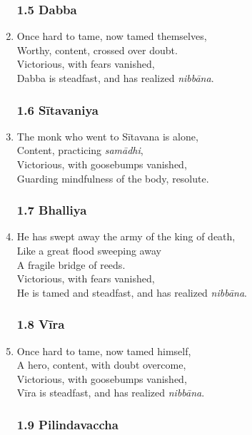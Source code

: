 \documentclass[10pt, openany]{book}
\begin{document}
\begin{enumerate}
\subsubsection*{1.5 Dabba}

\item Once hard to tame, now tamed themselves,\\
Worthy, content, crossed over doubt.\\
Victorious, with fears vanished,\\
Dabba is steadfast, and has realized \emph{nibbāna}.

\subsubsection*{1.6 Sītavaniya}

\item The monk who went to Sītavana is alone,\\
Content, practicing \emph{samādhi},\\
Victorious, with goosebumps vanished,\\
Guarding mindfulness of the body, resolute.

\subsubsection*{1.7 Bhalliya}

\item He has swept away the army of the king of death,\\
Like a great flood sweeping away\\
A fragile bridge of reeds.\\
Victorious, with fears vanished,\\
He is tamed and steadfast, and has realized \emph{nibbāna}.

\subsubsection*{1.8 Vīra}

\item Once hard to tame, now tamed himself,\\
A hero, content, with doubt overcome,\\
Victorious, with goosebumps vanished,\\
Vīra is steadfast, and has realized \emph{nibbāna}.

\subsubsection*{1.9 Pilindavaccha}


\end{enumerate}
\end{document}
